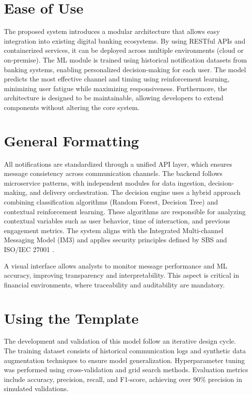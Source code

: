 \documentclass[conference]{IEEEtran}
\begin{document}
\section{Ease of Use}

The proposed system introduces a modular architecture that allows easy integration into existing digital banking ecosystems. By using RESTful APIs and containerized services, it can be deployed across multiple environments (cloud or on-premise). The ML module is trained using historical notification datasets from banking systems, enabling personalized decision-making for each user. The model predicts the most effective channel and timing using reinforcement learning, minimizing user fatigue while maximizing responsiveness. Furthermore, the architecture is designed to be maintainable, allowing developers to extend components without altering the core system.

\section{General Formatting}

All notifications are standardized through a unified API layer, which ensures message consistency across communication channels. The backend follows microservice patterns, with independent modules for data ingestion, decision-making, and delivery orchestration. The decision engine uses a hybrid approach combining classification algorithms (Random Forest, Decision Tree) and contextual reinforcement learning. These algorithms are responsible for analyzing contextual variables such as user behavior, time of interaction, and previous engagement metrics. The system aligns with the Integrated Multi-channel Messaging Model (IM3) \cite{liang2011} and applies security principles defined by SBS and ISO/IEC 27001 \cite{sbs2021}.

A visual interface allows analysts to monitor message performance and ML accuracy, improving transparency and interpretability. This aspect is critical in financial environments, where traceability and auditability are mandatory.

\section{Using the Template}

The development and validation of this model follow an iterative design cycle. The training dataset consists of historical communication logs and synthetic data augmentation techniques to ensure model generalization. Hyperparameter tuning was performed using cross-validation and grid search methods. Evaluation metrics include accuracy, precision, recall, and F1-score, achieving over 90\% precision in simulated validations. 
\end{document}

